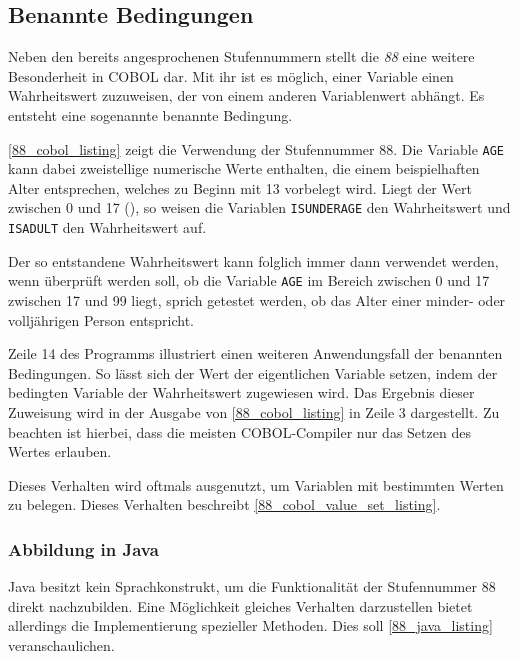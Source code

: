 \subsection{Benannte Bedingungen}
Neben den bereits angesprochenen Stufennummern stellt die \textit{88} eine weitere Besonderheit in COBOL dar. Mit ihr ist es möglich, einer Variable einen Wahrheitswert zuzuweisen, der von einem anderen Variablenwert abhängt. Es entsteht eine sogenannte benannte Bedingung.

\autoref{88_cobol_listing} zeigt die Verwendung der Stufennummer 88. Die Variable \texttt{AGE} kann dabei zweistellige numerische Werte enthalten, die einem beispielhaften Alter entsprechen, welches zu Beginn mit 13 vorbelegt wird. Liegt der Wert zwischen 0 und 17 (), so weisen die Variablen \texttt{ISUNDERAGE} den Wahrheitswert  und \texttt{ISADULT} den Wahrheitswert  auf.

Der so entstandene Wahrheitswert kann folglich immer dann verwendet werden, wenn überprüft werden soll, ob die Variable \texttt{AGE} im Bereich zwischen 0 und 17 \bzw zwischen 17 und 99 liegt, sprich getestet werden, ob das Alter einer minder- oder volljährigen Person entspricht.

\sepCodeAndOutputCheck
{}
Zeile 14 des Programms illustriert einen weiteren Anwendungsfall der benannten Bedingungen. So lässt sich der Wert der eigentlichen Variable setzen, indem der bedingten Variable der Wahrheitswert  zugewiesen wird. Das Ergebnis dieser Zuweisung wird in der Ausgabe von \autoref{88_cobol_listing} in Zeile 3 dargestellt. Zu beachten ist hierbei, dass die meisten COBOL-Compiler nur das Setzen des Wertes  erlauben.

Dieses Verhalten wird oftmals ausgenutzt, um Variablen mit bestimmten Werten zu belegen. Dieses Verhalten beschreibt \autoref{88_cobol_value_set_listing}.

\subsubsection*{Abbildung in Java}
Java besitzt kein Sprachkonstrukt, um die Funktionalität der Stufennummer 88 direkt nachzubilden. Eine Möglichkeit gleiches Verhalten darzustellen bietet allerdings die Implementierung spezieller Methoden. Dies soll \autoref{88_java_listing} veranschaulichen.

